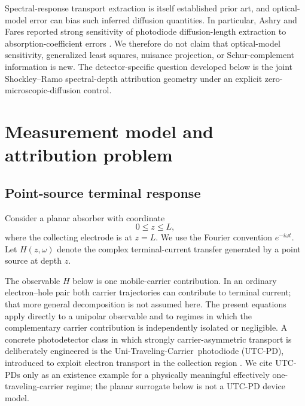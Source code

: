 \documentclass[aps,pra,twocolumn,superscriptaddress,nofootinbib]{revtex4-2}
\begin{document}
Spectral-response transport extraction is itself established prior art, and optical-model error can bias such inferred diffusion quantities. In particular, Ashry and Fares reported strong sensitivity of photodiode diffusion-length extraction to absorption-coefficient errors \cite{ashry2003diffusion}. We therefore do not claim that optical-model sensitivity, generalized least squares, nuisance projection, or Schur-complement information is new. The detector-specific question developed below is the joint Shockley--Ramo spectral-depth attribution geometry under an explicit zero-microscopic-diffusion control.


\section{Measurement model and attribution problem}
\label{sec:model}

\subsection{Point-source terminal response}

Consider a planar absorber with coordinate
\begin{equation}
0\le z\le L,
\end{equation}
where the collecting electrode is at $z=L$. We use the Fourier convention $e^{-i\omega t}$. Let $H(z,\omega)$ denote the complex terminal-current transfer generated by a point source at depth $z$.

The observable $H$ below is one mobile-carrier contribution. In an ordinary electron--hole pair both carrier trajectories can contribute to terminal current; that more general decomposition is not assumed here. The present equations apply directly to a unipolar observable and to regimes in which the complementary carrier contribution is independently isolated or negligible. A concrete photodetector class in which strongly carrier-asymmetric transport is deliberately engineered is the \mbox{Uni-Traveling-Carrier photodiode} (UTC-PD), introduced to exploit electron transport in the collection region \cite{ishibashi1997utc}. We cite UTC-PDs only as an existence example for a physically meaningful effectively one-traveling-carrier regime; the planar surrogate below is not a UTC-PD device model.
\end{document}

